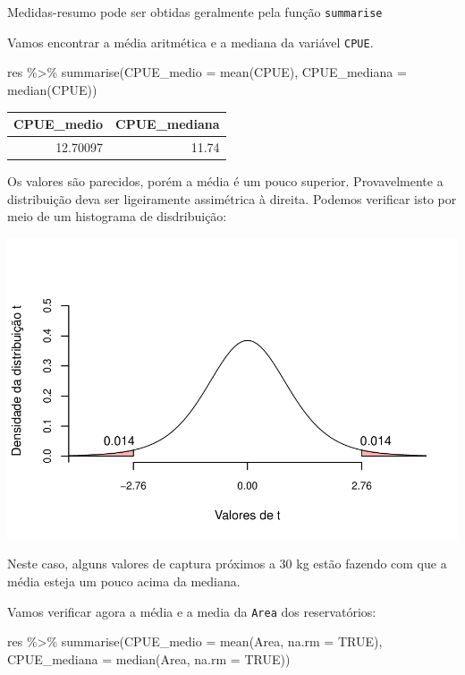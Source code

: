 \documentclass[
]{book}
\newenvironment{Shaded}{\begin{snugshade}}{\end{snugshade}}
\newcommand{\AttributeTok}[1]{\textcolor[rgb]{0.77,0.63,0.00}{#1}}
\newcommand{\ConstantTok}[1]{\textcolor[rgb]{0.00,0.00,0.00}{#1}}
\newcommand{\FunctionTok}[1]{\textcolor[rgb]{0.00,0.00,0.00}{#1}}
\newcommand{\NormalTok}[1]{#1}
\newcommand{\SpecialCharTok}[1]{\textcolor[rgb]{0.00,0.00,0.00}{#1}}
\begin{document}
Medidas-resumo pode ser obtidas geralmente pela função \texttt{summarise}

Vamos encontrar a média aritmética e a mediana da variável \texttt{CPUE}.

\begin{Shaded}
\begin{Highlighting}[]
\NormalTok{res }\SpecialCharTok{\%\textgreater{}\%} 
  \FunctionTok{summarise}\NormalTok{(}\AttributeTok{CPUE\_medio =} \FunctionTok{mean}\NormalTok{(CPUE),}
            \AttributeTok{CPUE\_mediana =} \FunctionTok{median}\NormalTok{(CPUE))}
\end{Highlighting}
\end{Shaded}

\begin{tabular}{r|r}
\hline
CPUE\_medio & CPUE\_mediana\\
\hline
12.70097 & 11.74\\
\hline
\end{tabular}

Os valores são parecidos, porém a média é um pouco superior. Provavelmente a distribuição deva ser ligeiramente assimétrica à direita. Podemos verificar isto por meio de um histograma de disdribuição:

\includegraphics{probest-cambientais_files/figure-latex/unnamed-chunk-125-1.pdf}

Neste caso, alguns valores de captura próximos a \(30\) kg estão fazendo com que a média esteja um pouco acima da mediana.

Vamos verificar agora a média e a media da \texttt{Area} dos reservatórios:

\begin{Shaded}
\begin{Highlighting}[]
\NormalTok{res }\SpecialCharTok{\%\textgreater{}\%} 
  \FunctionTok{summarise}\NormalTok{(}\AttributeTok{CPUE\_medio =} \FunctionTok{mean}\NormalTok{(Area, }\AttributeTok{na.rm =} \ConstantTok{TRUE}\NormalTok{),}
            \AttributeTok{CPUE\_mediana =} \FunctionTok{median}\NormalTok{(Area, }\AttributeTok{na.rm =} \ConstantTok{TRUE}\NormalTok{))}
\end{Highlighting}
\end{Shaded}
\end{document}
